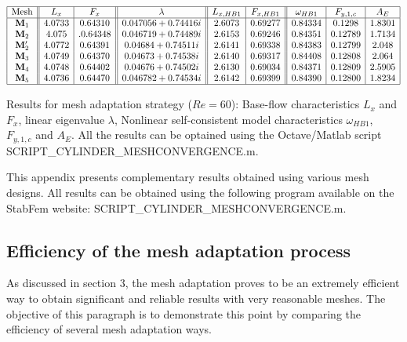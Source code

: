\documentclass[twocolumn,10pt]{asme2ej}
\begin{document}
\begin{table*}
$$
\begin{array}{|c||c|c||c||c|c||c|c|c|}
\hline
\mbox{Mesh} & L_x & F_x & \lambda & L_{x,HB1} & F_{x,HB1} & \omega_{HB1}  & F_{y,1,c} & A_{E} \\
\hline
\mathbf{M}_1 & 4.0733 & 0.64310	& 0.047056 + 0.74416i 		& 2.6073  & 0.69277 	&  0.84334 & 0.1298 & 1.8301  \\
\mathbf{M}_2 & 4.075 &.  0.64348  	& 0.046719 + 0.74489i 		& 2.6153  & 0.69246 	& 0.84351 & 0.12789 & 1.7134 \\ 
\mathbf{M}_2' & 4.0772 & 0.64391 	& 0.04684 +  0.74511i 		& 2.6141  & 0.69338 	& 0.84383 & 0.12799 & 2.048   \\  
\mathbf{M}_3 & 4.0749 & 0.64370 	& 0.04673 + 0.74538i		& 2.6140     & 0.69317	& 0.84408 & 0.12808 & 2.064   \\ 
\mathbf{M}_4 & 4.0748 & 0.64402 	& 0.04676  + 0.74502i 		& 2.6130 	& 0.69034 	& 0.84371 & 0.12809 & 2.5905 \\
\mathbf{M}_5 & 4.0736 & 0.64470	& 0.046782+0.74534i		& 2.6142 	& 0.69399		& 0.84390 & 0.12800 & 1.8234 \\
\hline
\end{array}
$$
\caption{Results for mesh adaptation strategy ($Re = 60$): Base-flow characteristics $L_x$ and $F_x$, linear eigenvalue $\lambda$, 
Nonlinear self-consistent model characteristics  $\omega_{HB1}$, $F_{y,1,c}$ and $A_E$. All the results can be optained using the Octave/Matlab script
{\sf SCRIPT\_CYLINDER\_MESHCONVERGENCE.m}. }
\label{tab:conv2}
\end{table*}



This appendix presents complementary results obtained using various mesh designs. 
All results can be obtained using the following program available on the StabFem website: 
{\sf SCRIPT\_CYLINDER\_MESHCONVERGENCE.m}.

\subsection{Efficiency of the mesh adaptation process}

As discussed in section 3, the mesh adaptation proves to be an extremely efficient way to obtain significant and reliable results 
with very reasonable meshes.
The objective of this paragraph is to demonstrate this point by comparing the efficiency of several mesh adaptation ways. 
\end{document}
